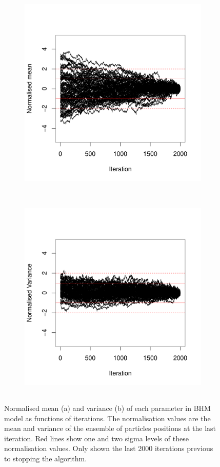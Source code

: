 \begin{figure}[ht!]
    \centering
    \begin{subfigure}[t]{\textwidth}
    \centering
        \includegraphics[height=10cm]{background/Figures/AllMeanParticles.pdf}
        \caption{}
        \label{}
    \end{subfigure}
    \begin{subfigure}[t]{\textwidth}
    \centering
      \includegraphics[height=10cm]{background/Figures/AllVarParticles.pdf}
        \caption{}
        \label{} 
    \end{subfigure}
\caption{Normalised mean (a) and variance (b) of each parameter in BHM model as functions of iterations. The normalisation values are the mean and variance of the ensemble of particles positions at the last iteration. Red lines show one and two sigma levels of these normalisation values. Only shown the last 2000 iterations previous to stopping the algorithm.}
\label{fig:convergence}
\end{figure}


